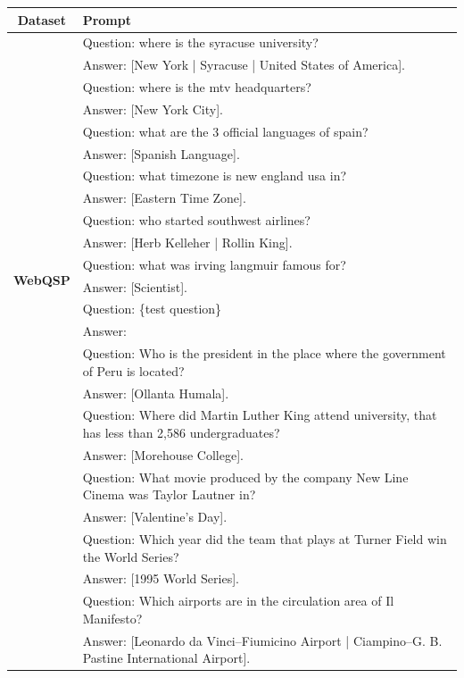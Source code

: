 \begin{table}[t]
    \small
    \centering
    \begin{tabular}{c | l}
    \toprule
    \textbf{Dataset} & \textbf{Prompt} \\
    \midrule
    \multirow{20}{*}{\textbf{WebQSP}}  & Question: where is the syracuse university? \\
    & Answer: [New York | Syracuse | United States of America].\\
    & Question: where is the mtv headquarters?\\
    & Answer: [New York City].\\
    & Question: what are the 3 official languages of spain?\\
    & Answer: [Spanish Language].\\
    & Question: what timezone is new england usa in?\\
    & Answer: [Eastern Time Zone].\\
    & Question: who started southwest airlines?\\
    & Answer: [Herb Kelleher | Rollin King].\\
    & Question: what was irving langmuir famous for?\\
    & Answer: [Scientist].\\
    & Question: \{test question\} \\
    & Answer:\\
    \midrule
    \multirow{20}{*}{\textbf{CWQ}}  & Question: Who is the president in the place where the government of Peru is located? \\
    & Answer: [Ollanta Humala].\\
    & Question: Where did Martin Luther King attend university, that has less than 2,586 undergraduates?\\
    & Answer: [Morehouse College].\\
    & Question: What movie produced by the company New Line Cinema was Taylor Lautner in?\\
    & Answer: [Valentine's Day].\\
    & Question: Which year did the team that plays at Turner Field win the World Series?\\
    & Answer: [1995 World Series].\\
    & Question: Which airports are in the circulation area of Il Manifesto?\\
    & Answer: [Leonardo da Vinci–Fiumicino Airport | Ciampino–G. B. Pastine International Airport].\\

\end{tabular}
\end{table}
